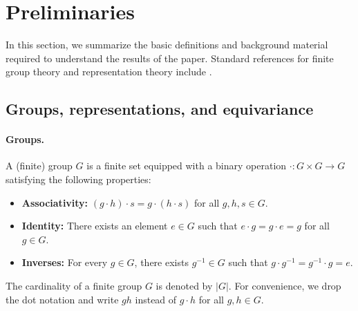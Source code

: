 \documentclass[11pt]{article}
\theoremstyle{plain}
\theoremstyle{definition}
\theoremstyle{remark}
\begin{document}
















\section{Preliminaries}\label{app_back}

In this section, we summarize the basic definitions and background material required to understand the results of the paper. Standard references for finite group theory and representation theory include \citep{serre1977linear,fulton2013representation}.


\subsection{Groups, representations, and equivariance}

\paragraph{Groups.}
A (finite) group $G$ is a finite set equipped with a binary operation $\cdot : G \times G \to G$ satisfying the following properties:
\begin{itemize}
    \item \textbf{Associativity:} $(g \cdot h) \cdot s = g \cdot (h \cdot s)$ for all $g,h,s \in G$.
    \item \textbf{Identity:} There exists an element $e \in G$ such that $e \cdot g = g \cdot e = g$ for all $g \in G$.
    \item \textbf{Inverses:} For every $g \in G$, there exists $g^{-1} \in G$ such that $g \cdot g^{-1} = g^{-1} \cdot g = e$.
\end{itemize}
The cardinality of a finite group $G$ is denoted by $|G|$. For convenience, we drop the dot notation and write $gh$ instead of $g \cdot h$ for all $g,h \in G$. 
\end{document}
